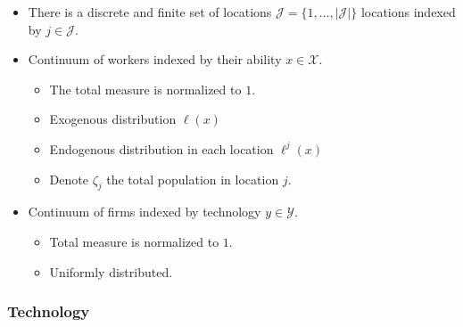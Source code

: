 \documentclass[
  letterpaper,
  DIV=11,
  numbers=noendperiod]{scrartcl}
\providecommand{\tightlist}{%
  \setlength{\itemsep}{0pt}\setlength{\parskip}{0pt}}\usepackage{longtable,booktabs,array}
\begin{document}
\begin{itemize}
\tightlist
\item
  There is a discrete and finite set of locations
  \(\mathcal{J}=\{1,\dots,|\mathcal{J}|\}\) locations indexed by
  \(j\in\mathcal{J}\).
\item
  Continuum of workers indexed by their ability \(x\in \mathcal{X}\).

  \begin{itemize}
  \tightlist
  \item
    The total measure is normalized to \(1\).
  \item
    Exogenous distribution \(\ell(x)\)
  \item
    Endogenous distribution in each location \(\ell^{j}(x)\)
  \item
    Denote \(\zeta_j\) the total population in location \(j\).
  \end{itemize}
\item
  Continuum of firms indexed by technology \(y\in \mathcal{Y}\).

  \begin{itemize}
  \tightlist
  \item
    Total measure is normalized to \(1\).
  \item
    Uniformly distributed.
  \end{itemize}
\end{itemize}

\hypertarget{technology}{%
\subsubsection{Technology}\label{technology}}
\end{document}
